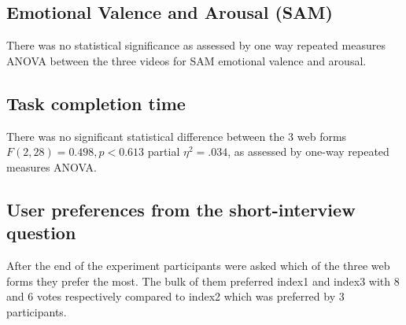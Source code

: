 \documentclass[../main/Feedback.tex]{subfiles}
\begin{document}
		\subsection{Emotional Valence and Arousal (SAM)}
%		
		There was no statistical significance as assessed by one way repeated measures ANOVA between the three videos for SAM emotional valence and arousal.
		\subsection{Task completion time}		
		There was no significant statistical difference between the 3 web forms $F(2,28)=0.498, p<0.613$ partial $\eta^{2}=.034$, as assessed by one-way repeated measures ANOVA.
		\subsection{User preferences from the short-interview question}
		After the end of the experiment participants were asked which of the three web forms they prefer the most. The bulk of them preferred index1 and index3 with 8 and 6 votes respectively compared to index2 which was preferred by 3 participants. 
\end{document}
